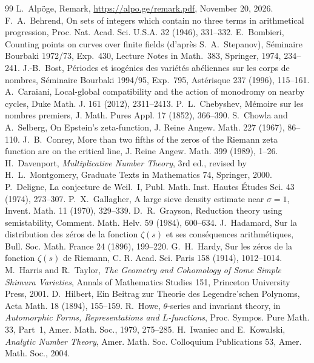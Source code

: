 \documentclass[11pt,letterpaper]{article}
\numberwithin{equation}{section}
\begin{document}
\begin{thebibliography}{99}\small
{} L.~Alp\"oge, Remark, \url{https://alpo.ge/remark.pdf}, November 20, 2026.
 F.~A.~Behrend, On sets of integers which contain no three terms in arithmetical progression, Proc. Nat. Acad. Sci. U.S.A. 32 (1946), 331--332.
 E.~Bombieri, Counting points on curves over finite fields (d'apr\`es S.~A.~Stepanov), S\'eminaire Bourbaki 1972/73, Exp.~430, Lecture Notes in Math.~383, Springer, 1974, 234--241.
 J.-B.~Bost, P\'eriodes et isog\'enies des vari\'et\'es ab\'eliennes sur les corps de nombres, S\'eminaire Bourbaki 1994/95, Exp.~795, Ast\'erisque 237 (1996), 115--161.
 A.~Caraiani, Local-global compatibility and the action of monodromy on nearby cycles, Duke Math. J. 161 (2012), 2311--2413.
 P.~L.~Chebyshev, M\'emoire sur les nombres premiers, J. Math. Pures Appl. 17 (1852), 366--390.
 S.~Chowla and A.~Selberg, On Epstein's zeta-function, J. Reine Angew. Math. 227 (1967), 86--110.
 J.~B.~Conrey, More than two fifths of the zeros of the Riemann zeta function are on the critical line, J. Reine Angew. Math. 399 (1989), 1--26.
 H.~Davenport, \emph{Multiplicative Number Theory}, 3rd ed., revised by H.~L.~Montgomery, Graduate Texts in Mathematics 74, Springer, 2000.
 P.~Deligne, La conjecture de Weil.~I, Publ. Math. Inst. Hautes \'Etudes Sci. 43 (1974), 273--307.
 P.~X.~Gallagher, A large sieve density estimate near $\sigma=1$, Invent. Math. 11 (1970), 329--339.
 D.~R.~Grayson, Reduction theory using semistability, Comment. Math. Helv. 59 (1984), 600--634.
 J.~Hadamard, Sur la distribution des z\'eros de la fonction $\zeta(s)$ et ses cons\'equences arithm\'etiques, Bull. Soc. Math. France 24 (1896), 199--220.
 G.~H.~Hardy, Sur les z\'eros de la fonction $\zeta(s)$ de Riemann, C. R. Acad. Sci. Paris 158 (1914), 1012--1014.
 M.~Harris and R.~Taylor, \emph{The Geometry and Cohomology of Some Simple Shimura Varieties}, Annals of Mathematics Studies 151, Princeton University Press, 2001.
 D.~Hilbert, Ein Beitrag zur Theorie des Legendre'schen Polynoms, Acta Math. 18 (1894), 155--159.
 R.~Howe, $\theta$-series and invariant theory, in \emph{Automorphic Forms, Representations and $L$-functions}, Proc. Sympos. Pure Math. 33, Part~1, Amer. Math. Soc., 1979, 275--285.
 H.~Iwaniec and E.~Kowalski, \emph{Analytic Number Theory}, Amer. Math. Soc. Colloquium Publications 53, Amer. Math. Soc., 2004.

\end{thebibliography}
\end{document}

